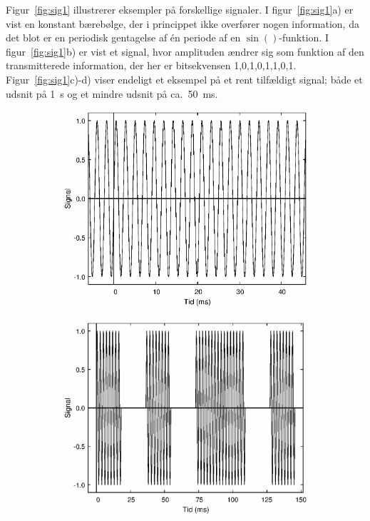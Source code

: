 \documentclass[11pt,a4paper]{article}
\begin{document}
Figur~\ref{fig:sig1} illustrerer eksempler på forskellige signaler. I figur~\ref{fig:sig1}a) er vist en konstant bærebølge, der i princippet ikke overfører nogen information, da det blot er en periodisk gentagelse af én periode af en $\sin()$-funktion. I figur~\ref{fig:sig1}b) er vist et signal, hvor amplituden ændrer sig som funktion af den transmitterede information, der her er bitsekvensen 1,0,1,0,1,1,0,1. Figur~\ref{fig:sig1}c)-d) viser endeligt et eksempel på et rent tilfældigt signal; både et udsnit på 1~s og et mindre udsnit på ca.~50~ms.
\begin{figure}[htbp]
\centering
\begin{subfigure}{0.48\textwidth}
\includegraphics[scale=0.5]{sigconst}
\end{subfigure}
\begin{subfigure}{0.48\textwidth}
\includegraphics[scale=0.5]{sigask}

\end{subfigure}
\end{figure}
\end{document}
